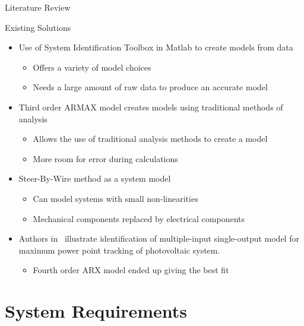\documentclass{beamer}
\begin{document}
\begin{frame}{Literature Review}
  \begin{block}{Existing Solutions}
 \begin{itemize}
        \item Use of System Identification Toolbox in Matlab to create models from data~\cite{Adnan2010}
	 \begin{itemize}
		    \tiny
		    		\item Offers a variety of model choices
				\item Needs a large amount of raw data to produce an accurate model
	\end{itemize}
	\item Third order ARMAX model creates models using traditional methods of analysis~\cite{Li1999}
	 \begin{itemize}
		    \tiny
		    		\item Allows the use of traditional analysis methods to create a model 
				\item More room for error during calculations
	\end{itemize}
	\item Steer-By-Wire method as a system model~\cite{Saruchi2015}
	 \begin{itemize}
		    \tiny
		    		\item Can model systems with small non-linearities 
				\item Mechanical components replaced by electrical components 
	\end{itemize}
	\item Authors in~\cite{Hussain2011} illustrate identification of multiple-input single-output model for maximum power point tracking of photovoltaic system.  
	\begin{itemize}
	\tiny
		\item Fourth order ARX model ended up giving the best fit
	\end{itemize}
\end{itemize}
  \end{block}
\end{frame}



\section{System Requirements}
\end{document}
